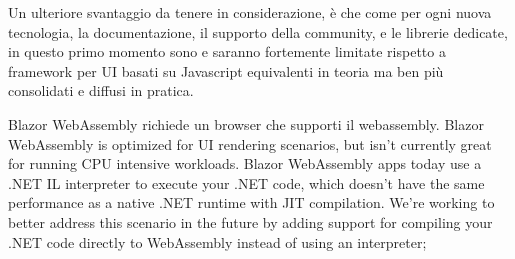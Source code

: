 Un ulteriore svantaggio da tenere in considerazione, \`e che come per ogni nuova tecnologia, la documentazione, il supporto della community, e le librerie dedicate, in questo primo momento sono e saranno fortemente limitate rispetto a framework per UI basati su Javascript equivalenti in teoria ma ben pi\`u consolidati e diffusi in pratica.

Blazor WebAssembly richiede un browser che supporti il webassembly.
Blazor WebAssembly is optimized for UI rendering scenarios, but isn’t currently great for running CPU intensive workloads. Blazor WebAssembly apps today use a .NET IL interpreter to execute your .NET code, which doesn’t have the same performance as a native .NET runtime with JIT compilation. We’re working to better address this scenario in the future by adding support for compiling your .NET code directly to WebAssembly instead of using an interpreter;
